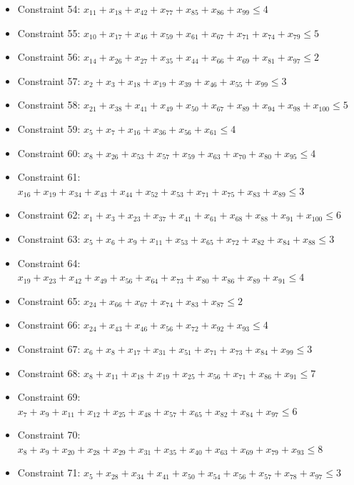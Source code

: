 \documentclass[11pt]{article}
\begin{document}
\begin{itemize}
\item Constraint 54: $x_{11} + x_{18} + x_{42} + x_{77} + x_{85} + x_{86} + x_{99} \le 4$
\item Constraint 55: $x_{10} + x_{17} + x_{46} + x_{59} + x_{61} + x_{67} + x_{71} + x_{74} + x_{79} \le 5$
\item Constraint 56: $x_{14} + x_{26} + x_{27} + x_{35} + x_{44} + x_{66} + x_{69} + x_{81} + x_{97} \le 2$
\item Constraint 57: $x_{2} + x_{3} + x_{18} + x_{19} + x_{39} + x_{46} + x_{55} + x_{99} \le 3$
\item Constraint 58: $x_{21} + x_{38} + x_{41} + x_{49} + x_{50} + x_{67} + x_{89} + x_{94} + x_{98} + x_{100} \le 5$
\item Constraint 59: $x_{5} + x_{7} + x_{16} + x_{36} + x_{56} + x_{61} \le 4$
\item Constraint 60: $x_{8} + x_{26} + x_{53} + x_{57} + x_{59} + x_{63} + x_{70} + x_{80} + x_{95} \le 4$
\item Constraint 61: $x_{16} + x_{19} + x_{34} + x_{43} + x_{44} + x_{52} + x_{53} + x_{71} + x_{75} + x_{83} + x_{89} \le 3$
\item Constraint 62: $x_{1} + x_{3} + x_{23} + x_{37} + x_{41} + x_{61} + x_{68} + x_{88} + x_{91} + x_{100} \le 6$
\item Constraint 63: $x_{5} + x_{6} + x_{9} + x_{11} + x_{53} + x_{65} + x_{72} + x_{82} + x_{84} + x_{88} \le 3$
\item Constraint 64: $x_{19} + x_{23} + x_{42} + x_{49} + x_{56} + x_{64} + x_{73} + x_{80} + x_{86} + x_{89} + x_{91} \le 4$
\item Constraint 65: $x_{24} + x_{66} + x_{67} + x_{74} + x_{83} + x_{87} \le 2$
\item Constraint 66: $x_{24} + x_{43} + x_{46} + x_{56} + x_{72} + x_{92} + x_{93} \le 4$
\item Constraint 67: $x_{6} + x_{8} + x_{17} + x_{31} + x_{51} + x_{71} + x_{73} + x_{84} + x_{99} \le 3$
\item Constraint 68: $x_{8} + x_{11} + x_{18} + x_{19} + x_{25} + x_{56} + x_{71} + x_{86} + x_{91} \le 7$
\item Constraint 69: $x_{7} + x_{9} + x_{11} + x_{12} + x_{25} + x_{48} + x_{57} + x_{65} + x_{82} + x_{84} + x_{97} \le 6$
\item Constraint 70: $x_{8} + x_{9} + x_{20} + x_{28} + x_{29} + x_{31} + x_{35} + x_{40} + x_{63} + x_{69} + x_{79} + x_{93} \le 8$
\item Constraint 71: $x_{5} + x_{28} + x_{34} + x_{41} + x_{50} + x_{54} + x_{56} + x_{57} + x_{78} + x_{97} \le 3$

\end{itemize}
\end{document}
